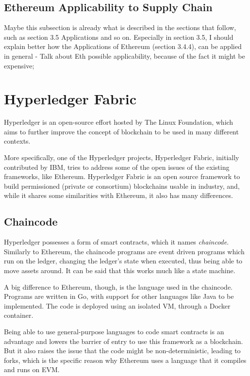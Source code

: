 \subsection{Ethereum Applicability to Supply Chain}
Maybe this subsection is already what is described in the sections that follow, such as section 3.5 Applications and so on. Especially in section 3.5, I should explain better how the Applications of Ethereum (section 3.4.4), can be applied in general
- Talk about Eth possible applicability, because of the fact it might be expensive;
\fi

\section{Hyperledger Fabric}

Hyperledger is an open-source effort hosted by The Linux Foundation, which aims to further improve the concept of blockchain to be used in many different contexts. 

More specifically, one of the Hyperledger projects, Hyperledger Fabric, initially contributed by IBM, tries to address some of the open issues of the existing frameworks, like Ethereum. Hyperledger Fabric is an open source framework to build permissioned (private or consortium) blockchains usable in industry, and, while it shares some similarities with Ethereum, it also has many differences. 

\subsection{Chaincode}
Hyperledger possesses a form of smart contracts, which it names \textit{chaincode}. Similarly to Ethereum, the chaincode programs are event driven programs which run on the ledger, changing the ledger's state when executed, thus being able to move assets around. It can be said that this works much like a state machine.

A big difference to Ethereum, though, is the language used in the chaincode. Programs are written in Go, with support for other languages like Java to be implemented. The code is deployed using an isolated VM, through a Docker container. 

Being able to use general-purpose languages to code smart contracts is an advantage and lowers the barrier of entry to use this framework as a blockchain. But it also raises the issue that the code might be non-deterministic, leading to forks, which is the specific reason why Ethereum uses a language that it compiles and runs on EVM. 

